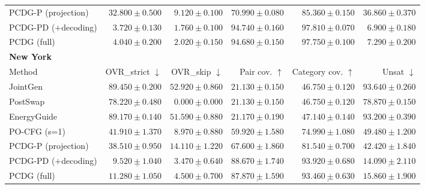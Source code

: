 \begin{table}[t]
\begin{tabular}{lrrrrr}
\midrule
\textsc{PCDG-P} (projection) & $32.800\pm 0.500$ & $9.120\pm 0.100$ & $70.990\pm 0.080$ & $85.360\pm 0.150$ & $36.860\pm 0.370$ \\
\textsc{PCDG-PD} ($+$decoding) & $\underline{3.720\pm 0.130}$ & $\mathbf{1.760\pm 0.100}$ & $\mathbf{94.740\pm 0.160}$ & $\mathbf{97.810\pm 0.070}$ & $\underline{6.900\pm 0.180}$ \\
\textsc{PCDG} (full) & $\mathbf{4.040\pm 0.200}$ & $\underline{2.020\pm 0.150}$ & $\underline{94.680\pm 0.150}$ & $\underline{97.750\pm 0.100}$ & $\mathbf{7.290\pm 0.200}$ \\
\midrule
\multicolumn{6}{l}{\textbf{New York}} \\
\midrule
Method & OVR\_strict $\downarrow$ & OVR\_skip $\downarrow$ & Pair cov. $\uparrow$ & Category cov. $\uparrow$ & Unsat $\downarrow$ \\
\midrule
JointGen & $89.450\pm 0.200$ & $52.920\pm 0.860$ & $\mathbf{21.130\pm 0.150}$ & $\mathbf{46.750\pm 0.120}$ & $93.640\pm 0.260$ \\
PostSwap & $\underline{78.220\pm 0.480}$ & $\underline{0.000\pm 0.000}$ & $\mathbf{21.130\pm 0.150}$ & $\mathbf{46.750\pm 0.120}$ & $\underline{78.870\pm 0.150}$ \\
EnergyGuide & $89.170\pm 0.140$ & $51.590\pm 0.880$ & $\underline{21.170\pm 0.190}$ & $\underline{47.140\pm 0.140}$ & $93.200\pm 0.390$ \\
PO-CFG (s=1) & $\mathbf{41.910\pm 1.370}$ & $\mathbf{8.970\pm 0.880}$ & $59.920\pm 1.580$ & $74.990\pm 1.080$ & $\mathbf{49.480\pm 1.200}$ \\
\midrule
\textsc{PCDG-P} (projection) & $38.510\pm 0.950$ & $14.110\pm 1.220$ & $67.600\pm 1.860$ & $81.540\pm 0.700$ & $42.420\pm 1.840$ \\
\textsc{PCDG-PD} ($+$decoding) & $\underline{9.520\pm 1.040}$ & $\underline{3.470\pm 0.640}$ & $\mathbf{88.670\pm 1.740}$ & $\mathbf{93.920\pm 0.680}$ & $\underline{14.090\pm 2.110}$ \\
\textsc{PCDG} (full) & $\mathbf{11.280\pm 1.050}$ & $\mathbf{4.500\pm 0.700}$ & $\underline{87.870\pm 1.590}$ & $\underline{93.460\pm 0.630}$ & $\mathbf{15.860\pm 1.900}$ \\
\bottomrule
\end{tabular}
\end{table}
